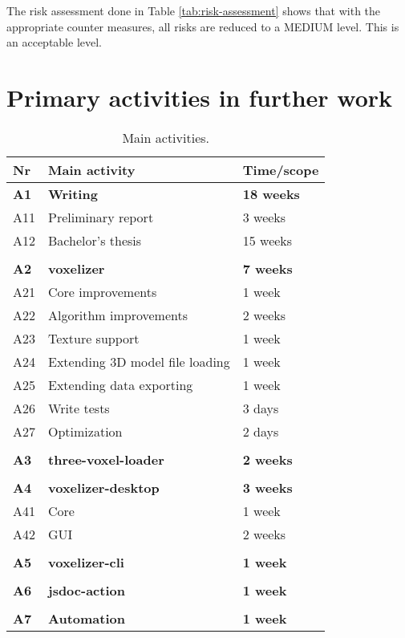 The risk assessment done in Table \ref{tab:risk-assessment} shows that with the appropriate counter measures, all risks are reduced to a MEDIUM level. This is an acceptable level.

\section{Primary activities in further work}
\label{sec:primary-activities}
\begin{table}[H]
\setlength{\tabcolsep}{2em}
\caption{Main activities.}
\begin{tabularx}{\textwidth}{@{\hspace*{2.5em}}l X l }
	\multicolumn{1}{l}{\textbf{Nr}} & \textbf{Main activity} & \textbf{Time/scope} \\
	\hline
	\multicolumn{1}{l}{\textbf{A1}} & \textbf{Writing} & \textbf{18 weeks} \\
	A11 & Preliminary report & 3 weeks \\
	A12 & Bachelor's thesis & 15 weeks \\
	\\
	\multicolumn{1}{l}{\textbf{A2}} & \textbf{voxelizer} & \textbf{7 weeks} \\
	A21 & Core improvements & 1 week\\
	A22 & Algorithm improvements & 2 weeks\\
	A23 & Texture support & 1 week \\
	A24 & Extending 3D model file loading & 1 week \\
	A25 & Extending data exporting & 1 week \\
	A26 & Write tests & 3 days \\
	A27 & Optimization & 2 days \\
	\\
	\multicolumn{1}{l}{\textbf{A3}} & \textbf{three-voxel-loader} & \textbf{2 weeks} \\
	\\
	\multicolumn{1}{l}{\textbf{A4}} & \textbf{voxelizer-desktop} & \textbf{3 weeks} \\
	A41 & Core & 1 week \\
	A42 & GUI & 2 weeks \\
	\\
	\multicolumn{1}{l}{\textbf{A5}} & \textbf{voxelizer-cli} & \textbf{1 week} \\
	\\
	\multicolumn{1}{l}{\textbf{A6}} & \textbf{jsdoc-action} & \textbf{1 week} \\
	\\
	\multicolumn{1}{l}{\textbf{A7}} & \textbf{Automation} & \textbf{1 week} \\
\end{tabularx}
\end{table}






